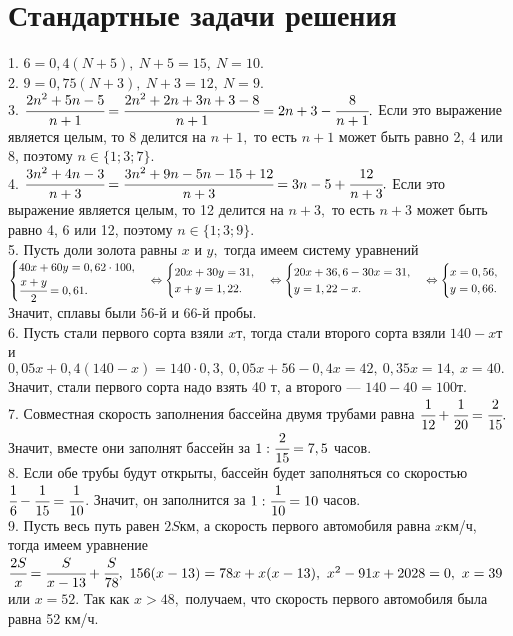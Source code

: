 \section{Стандартные задачи решения}
1. $6=0,4(N+5),\ N+5=15,\ N=10.$\\
2. $9=0,75(N+3),\ N+3=12,\ N=9.$\\
3. $\cfrac{2n^2+5n-5}{n+1}=\cfrac{2n^2+2n+3n+3-8}{n+1}=2n+3-\cfrac{8}{n+1}.$ Если это выражение является целым, то 8 делится на $n+1,$ то есть $n+1$ может быть равно 2, 4 или 8, поэтому $n\in \{1;3;7\}.$\\
4. $\cfrac{3n^2+4n-3}{n+3}=\cfrac{3n^2+9n-5n-15+12}{n+3}=3n-5+\cfrac{12}{n+3}.$ Если это выражение является целым, то 12 делится на $n+3,$ то есть $n+3$ может быть равно 4, 6 или 12, поэтому $n\in \{1;3;9\}.$\\
5. Пусть доли золота равны $x$ и $y,$ тогда имеем систему уравнений $\begin{cases} 40x+60y=0,62\cdot100,\\ \cfrac{x+y}{2}=0,61.\end{cases}\Leftrightarrow
\begin{cases} 20x+30y=31,\\ x+y=1,22.\end{cases}\Leftrightarrow
\begin{cases} 20x+36,6-30x=31,\\ y=1,22-x.\end{cases}\Leftrightarrow
\begin{cases} x=0,56,\\ y=0,66.\end{cases}$
Значит, сплавы были 56-й и 66-й пробы.\\
6. Пусть стали первого сорта взяли $x$т, тогда стали второго сорта взяли $140-x$т и $0,05x+0,4(140-x)=140\cdot0,3,\ 0,05x+56-0,4x=42,\ 0,35x=14,\ x=40.$ Значит, стали первого сорта надо взять 40 т, а второго --- $140-40=100$т.\\
7. Совместная скорость заполнения бассейна двумя трубами равна $\cfrac{1}{12}+\cfrac{1}{20}=\cfrac{2}{15}.$ Значит, вместе они заполнят бассейн за $1:\cfrac{2}{15}=7,5$ часов.\\
8. Если обе трубы будут открыты, бассейн будет заполняться со скоростью $\cfrac{1}{6}-\cfrac{1}{15}=\cfrac{1}{10}$. Значит, он заполнится за $1:\cfrac{1}{10}=10$ часов.\\
9. Пусть весь путь равен $2S$км, а скорость первого автомобиля равна $x$км/ч, тогда имеем уравнение $\cfrac{2S}{x}=\cfrac{S}{x-13}+\cfrac{S}{78},\
156(x-13)=78x+x(x-13),\ x^2-91x+2028=0,\ x=39$ или $x=52.$ Так как $x>48,$ получаем, что скорость первого автомобиля была равна 52 км/ч.\\
